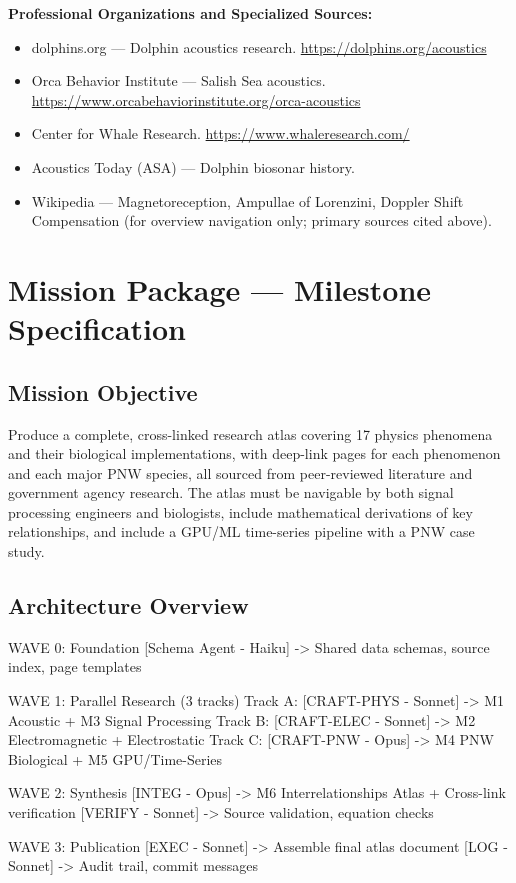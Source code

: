 \documentclass[11pt,letterpaper]{article}
\newcommand{\stageheader}[2]{%
  \noindent\colorbox{#2}{\makebox[\textwidth][l]{%
    \textcolor{white}{\bfseries\sffamily\hspace{6pt}#1\hspace{6pt}}}}%
  \vspace{0.5em}\par%
}
\begin{document}
\textbf{Professional Organizations and Specialized Sources:}
\begin{itemize}[noitemsep]
  \item dolphins.org --- Dolphin acoustics research. \url{https://dolphins.org/acoustics}
  \item Orca Behavior Institute --- Salish Sea acoustics. \url{https://www.orcabehaviorinstitute.org/orca-acoustics}
  \item Center for Whale Research. \url{https://www.whaleresearch.com/}
  \item Acoustics Today (ASA) --- Dolphin biosonar history.
  \item Wikipedia --- Magnetoreception, Ampullae of Lorenzini, Doppler Shift Compensation (for overview navigation only; primary sources cited above).
\end{itemize}

\newpage
\stageheader{STAGE 3 --- MISSION PACKAGE}{tertiary}

\section{Mission Package --- Milestone Specification}

\subsection{Mission Objective}

Produce a complete, cross-linked research atlas covering 17 physics phenomena and their biological implementations, with deep-link pages for each phenomenon and each major PNW species, all sourced from peer-reviewed literature and government agency research. The atlas must be navigable by both signal processing engineers and biologists, include mathematical derivations of key relationships, and include a GPU/ML time-series pipeline with a PNW case study.

\subsection{Architecture Overview}

\begin{asciibox}
WAVE 0: Foundation
  [Schema Agent - Haiku] -> Shared data schemas, source index, page templates

WAVE 1: Parallel Research (3 tracks)
  Track A: [CRAFT-PHYS - Sonnet] -> M1 Acoustic + M3 Signal Processing
  Track B: [CRAFT-ELEC - Sonnet] -> M2 Electromagnetic + Electrostatic
  Track C: [CRAFT-PNW  - Opus]  -> M4 PNW Biological + M5 GPU/Time-Series

WAVE 2: Synthesis
  [INTEG - Opus] -> M6 Interrelationships Atlas + Cross-link verification
  [VERIFY - Sonnet] -> Source validation, equation checks

WAVE 3: Publication
  [EXEC - Sonnet] -> Assemble final atlas document
  [LOG - Sonnet]  -> Audit trail, commit messages
\end{asciibox}
\end{document}
